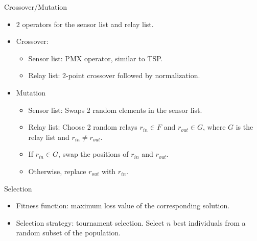 \documentclass[main.tex]{subfiles}
\begin{document}
\begin{frame}{Crossover/Mutation}
	\begin{itemize}
		\item 2 operators for the sensor list and relay list.
		\pause
		\item {
			Crossover:
			\begin{itemize}
				\pause
				\item Sensor list: PMX operator, similar to TSP.
				\pause
				\item Relay list: 2-point crossover followed by normalization.
			\end{itemize}
		}
		\item {
			Mutation
			\begin{itemize}
				\item Sensor list: Swaps 2 random elements in the sensor list.
				\pause
				\item Relay list: Choose 2 random relays $r_{in} \in F$ and $r_{out} \in G$, where $G$ is the relay list and $r_{in} \neq r_{out}$.
				\item If $r_{in} \in G$, swap the positions of $r_{in}$ and $r_{out}$. 
				\item Otherwise, replace $r_{out}$ with $r_{in}$.
			\end{itemize}
		}
	\end{itemize}
\end{frame}

\begin{frame}{Selection}
	\begin{itemize}
		\item Fitness function: maximum loss value of the corresponding solution.
		\item Selection strategy: tournament selection. Select $n$ best individuals from a random subset of the population.
	\end{itemize}
\end{frame}
\end{document}
